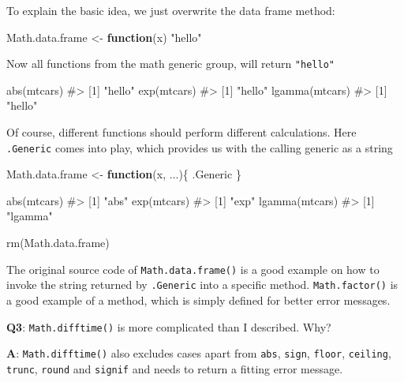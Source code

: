 \documentclass[
]{krantz}
\makeatletter
\newenvironment{Shaded}{\begin{snugshade}}{\end{snugshade}}
\newcommand{\CommentTok}[1]{\textcolor[rgb]{0.56,0.35,0.01}{\textit{#1}}}
\newcommand{\ControlFlowTok}[1]{\textcolor[rgb]{0.13,0.29,0.53}{\textbf{#1}}}
\newcommand{\KeywordTok}[1]{\textcolor[rgb]{0.13,0.29,0.53}{\textbf{#1}}}
\newcommand{\NormalTok}[1]{#1}
\newcommand{\StringTok}[1]{\textcolor[rgb]{0.31,0.60,0.02}{#1}}
\newenvironment{kframe}{%
\medskip{}
\setlength{\fboxsep}{.8em}
 \def\at@end@of@kframe{}%
 \ifinner\ifhmode%
  \def\at@end@of@kframe{\end{minipage}}%
  \begin{minipage}{\columnwidth}%
 \fi\fi%
 \def\FrameCommand##1{\hskip\@totalleftmargin \hskip-\fboxsep
 \colorbox{shadecolor}{##1}\hskip-\fboxsep
     \hskip-\linewidth \hskip-\@totalleftmargin \hskip\columnwidth}%
 \MakeFramed {\advance\hsize-\width
   \@totalleftmargin\z@ \linewidth\hsize
   \@setminipage}}%
 {\par\unskip\endMakeFramed%
 \at@end@of@kframe}
\renewenvironment{Shaded}{\begin{kframe}}{\end{kframe}}
\renewcommand{\KeywordTok} [1]{\textcolor[rgb]{0.00,0.44,0.13}{{#1}}}
\renewcommand{\StringTok}  [1]{\textcolor[rgb]{0.25,0.44,0.63}{{#1}}}
\renewcommand{\CommentTok} [1]{\textcolor[rgb]{0.38,0.63,0.69}{{#1}}}
\renewcommand{\NormalTok}  [1]{{#1}}
\makeatother
\begin{document}
To explain the basic idea, we just overwrite the data frame method:

\begin{Shaded}
\begin{Highlighting}[]
\NormalTok{Math.data.frame <-}\StringTok{ }\ControlFlowTok{function}\NormalTok{(x) }\StringTok{"hello"}
\end{Highlighting}
\end{Shaded}

Now all functions from the math generic group, will return \texttt{"hello"}

\begin{Shaded}
\begin{Highlighting}[]
\KeywordTok{abs}\NormalTok{(mtcars)}
\CommentTok{#> [1] "hello"}
\KeywordTok{exp}\NormalTok{(mtcars)}
\CommentTok{#> [1] "hello"}
\KeywordTok{lgamma}\NormalTok{(mtcars)}
\CommentTok{#> [1] "hello"}
\end{Highlighting}
\end{Shaded}

Of course, different functions should perform different calculations. Here \texttt{.Generic} comes into play, which provides us with the calling generic as a string

\begin{Shaded}
\begin{Highlighting}[]
\NormalTok{Math.data.frame <-}\StringTok{ }\ControlFlowTok{function}\NormalTok{(x, ...)\{}
\NormalTok{  .Generic}
\NormalTok{\}}

\KeywordTok{abs}\NormalTok{(mtcars)}
\CommentTok{#> [1] "abs"}
\KeywordTok{exp}\NormalTok{(mtcars)}
\CommentTok{#> [1] "exp"}
\KeywordTok{lgamma}\NormalTok{(mtcars)}
\CommentTok{#> [1] "lgamma"}

\KeywordTok{rm}\NormalTok{(Math.data.frame)}
\end{Highlighting}
\end{Shaded}

The original source code of \texttt{Math.data.frame()} is a good example on how to invoke the string returned by \texttt{.Generic} into a specific method. \texttt{Math.factor()} is a good example of a method, which is simply defined for better error messages.

\textbf{{Q3}}: \texttt{Math.difftime()} is more complicated than I described. Why?

\textbf{{A}}: \texttt{Math.difftime()} also excludes cases apart from \texttt{abs}, \texttt{sign}, \texttt{floor}, \texttt{ceiling}, \texttt{trunc}, \texttt{round} and \texttt{signif} and needs to return a fitting error message.
\end{document}
